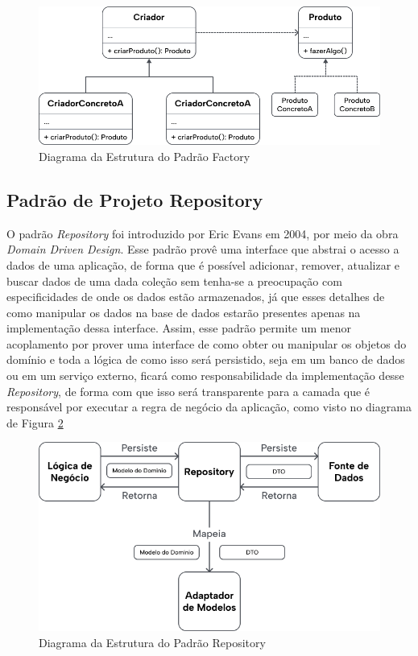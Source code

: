 \documentclass[12pt, %
openright, 
oneside, %
a4paper,    %
brazil]{facom-ufu-abntex2}
\begin{document}
\begin{figure}[ht]
    \centering
    \includegraphics[width=.65\textwidth]{figures/bibliographical_review/factory_diagram.png}
    \caption{Diagrama da Estrutura do Padrão Factory}
    \label{fig:factory_diagram}
\end{figure}

\subsection{Padrão de Projeto Repository}
O padrão \textit{Repository} foi introduzido por Eric Evans em 2004, por meio da obra \textit{Domain Driven Design}. Esse padrão provê uma interface que abstrai o acesso a dados de uma aplicação, de forma que é possível adicionar, remover, atualizar e buscar dados de uma dada coleção sem tenha-se a preocupação com especificidades de onde os dados estão armazenados, já que esses detalhes de como manipular os dados na base de dados estarão presentes apenas na implementação dessa interface. Assim, esse padrão permite um menor acoplamento por prover uma interface de como obter ou manipular os objetos do domínio e toda a lógica de como isso será persistido, seja em um banco de dados ou em um serviço externo, ficará como responsabilidade da implementação desse \textit{Repository}, de forma com que isso será transparente para a camada que é responsável por executar a regra de negócio da aplicação, como visto no diagrama de Figura \ref{fig:repository_diagram}

\begin{figure}[ht]
    \centering
    \includegraphics[width=.65\textwidth]{figures/bibliographical_review/repository_diagram.png}
    \caption{Diagrama da Estrutura do Padrão Repository}
    \label{fig:repository_diagram}
\end{figure}
\end{document}
